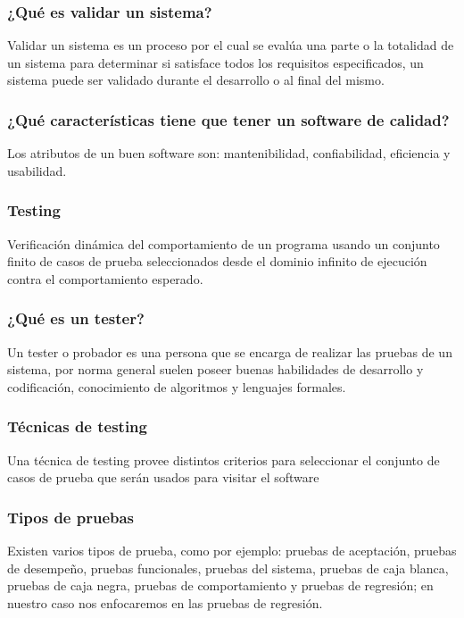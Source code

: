 \documentclass[conference]{IEEEtran}
\begin{document}
\subsubsection{¿Qué es validar un sistema? }

Validar un sistema es un proceso por el cual se evalúa una parte o la totalidad de un sistema para determinar si satisface todos los requisitos especificados, un sistema puede ser validado durante el desarrollo o al final del mismo.
\subsubsection{¿Qué características tiene que tener un software de calidad? }

 Los atributos de un buen software son: mantenibilidad, confiabilidad, eficiencia y usabilidad.
\subsubsection{Testing}
Verificación dinámica del comportamiento de un programa usando un conjunto finito de casos de prueba seleccionados desde el dominio infinito de ejecución contra el comportamiento esperado.

\subsubsection{¿Qué es un tester?}

Un tester o probador es una persona que se encarga de realizar las pruebas de un sistema, por norma general suelen poseer buenas habilidades de desarrollo y codificación, conocimiento de algoritmos y lenguajes formales.

\subsubsection{Técnicas de testing}

 Una técnica de testing provee distintos criterios para seleccionar el conjunto de casos de prueba que serán usados para visitar el software
 
\subsubsection{Tipos de pruebas}
 
 Existen varios tipos de prueba, como por ejemplo: pruebas de aceptación, pruebas de desempeño, pruebas funcionales, pruebas del sistema, pruebas de caja blanca, pruebas de caja negra, pruebas de comportamiento y pruebas de regresión; en nuestro caso nos enfocaremos en las pruebas de regresión.
 
\end{document}
